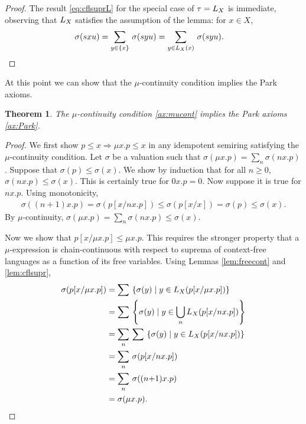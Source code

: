 \documentclass[copyright,creativecommons]{eptcs}
\newtheorem{theorem}{Theorem}[section]
\theoremstyle{remark}
\newcommand\subst[2]{[#1/#2]}
\newcommand\Imp{\mathrel\Rightarrow}
\newcommand\set[2]{\left\{#1\mid #2\right\}}
\newcommand\cset[1]{\{#1\}}
\begin{document}
\begin{proof}
The result \eqref{eq:cflsuprL} for the special case of $\tau=L_{X}$ is immediate, observing that $L_{X}$ satisfies the assumption of the lemma: for $x\in X$,
\begin{align*}
\sigma(sxu) &= \sum_{y\in\cset x}\,\sigma(syu) = \sum_{y\in\canon X(x)}\,\sigma(syu).
\end{align*}
\end{proof}



At this point we can show that the $\mu$-continuity condition implies the Park axioms.
\begin{theorem}
The $\mu$-continuity condition \eqref{ax:mucont} implies the Park axioms \eqref{ax:Park}.
\end{theorem}
\begin{proof}
We first show $p\leq x\Imp\mu x.p\leq x$ in any idempotent semiring satisfying the $\mu$-continuity condition. Let $\sigma$ be a valuation such that $\sigma(\mu x.p) = \sum_n \sigma(nx.p)$. Suppose that $\sigma(p)\leq \sigma(x)$. We show by induction that for all $n\geq 0$, $\sigma(nx.p)\leq \sigma(x)$. This is certainly true for $0x.p = 0$. Now suppose it is true for $nx.p$. Using monotonicity,
\begin{align*}
\sigma((n{+}1)x.p) = \sigma(p\subst x{nx.p}) \leq \sigma(p\subst xx) = \sigma(p) \leq \sigma(x).
\end{align*}
By $\mu$-continuity, $\sigma(\mu x.p) = \sum_n \sigma(nx.p) \leq \sigma(x)$.

Now we show that $p\subst x{\mu x.p} \leq \mu x.p$. This requires the stronger property that a $\mu$-expression is chain-continuous with respect to suprema of context-free languages as a function of its free variables. Using Lemmas \ref{lem:freecont} and \ref{lem:cflsupr},
\begin{align*}
\sigma(p\subst x{\mu x.p}) &= \sum\,\set{\sigma(y)}{y\in\canon X(p\subst x{\mu x.p})}\\
&= \sum\,\set{\sigma(y)}{y\in\bigcup_n\canon X(p\subst x{nx.p})}\\
&= \sum_n\,\sum\,\set{\sigma(y)}{y\in\canon X(p\subst x{nx.p})}\\
&= \sum_n\,\sigma(p\subst x{nx.p})\\
&= \sum_n\,\sigma((n{+}1)x.p)\\
&= \sigma(\mu x.p).
\end{align*}
\end{proof}
\end{document}
